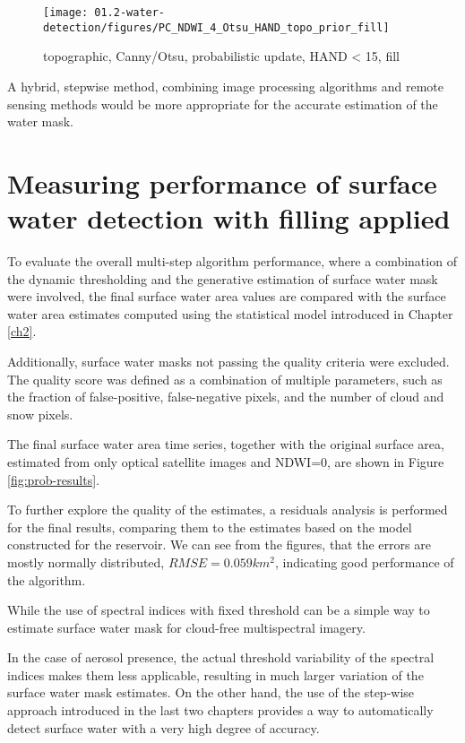 \begin{figure}
	\centering
	\texttt{[image: 01.2-water-detection/figures/PC\_NDWI\_4\_Otsu\_HAND\_topo\_prior\_fill]}
	\caption{topographic, Canny/Otsu, probabilistic update, HAND < 15, fill}
	\label{fig:r1_canny_otsu_topo_hand_nb_fill}
\end{figure}

A hybrid, stepwise method, combining image processing algorithms and remote sensing methods would be more appropriate for the accurate estimation of the water mask.

\newpage


\section{Measuring performance of surface water detection with filling applied}

To evaluate the overall multi-step algorithm performance, where a combination of the dynamic thresholding and the generative estimation of surface water mask were involved, the final surface water area values are compared with the surface water area estimates computed using the statistical model introduced in Chapter \ref{ch2}. 

Additionally, surface water masks not passing the quality criteria were excluded. The quality score was defined as a combination of multiple parameters, such as the fraction of false-positive, false-negative pixels, and the number of cloud and snow pixels. 

The final surface water area time series, together with the original surface area, estimated from only optical satellite images and NDWI=0, are shown in Figure \ref{fig:prob-results}.

To further explore the quality of the estimates, a residuals analysis is performed for the final results, comparing them to the estimates based on the model constructed for the reservoir. We can see from the figures, that the errors are mostly normally distributed, $RMSE=0.059km^2$, indicating good performance of the algorithm.

While the use of spectral indices with fixed threshold can be a simple way to estimate surface water mask for cloud-free multispectral imagery. 

In the case of aerosol presence, the actual threshold variability of the spectral indices makes them less applicable, resulting in much larger variation of the surface water mask estimates. On the other hand, the use of the step-wise approach introduced in the last two chapters provides a way to automatically detect surface water with a very high degree of accuracy.

